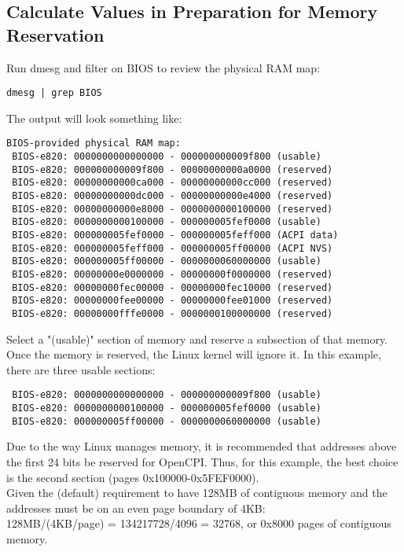 \begin{flushleft}
\subsection{Calculate Values in Preparation for Memory Reservation}
Run dmesg and filter on BIOS to review the physical RAM map: \\
\begin{lstlisting}
dmesg | grep BIOS
\end{lstlisting}
The output will look something like:
\begin{lstlisting}
BIOS-provided physical RAM map:
 BIOS-e820: 0000000000000000 - 000000000009f800 (usable)
 BIOS-e820: 000000000009f800 - 00000000000a0000 (reserved)
 BIOS-e820: 00000000000ca000 - 00000000000cc000 (reserved)
 BIOS-e820: 00000000000dc000 - 00000000000e4000 (reserved)
 BIOS-e820: 00000000000e8000 - 0000000000100000 (reserved)
 BIOS-e820: 0000000000100000 - 000000005fef0000 (usable)
 BIOS-e820: 000000005fef0000 - 000000005feff000 (ACPI data)
 BIOS-e820: 000000005feff000 - 000000005ff00000 (ACPI NVS)
 BIOS-e820: 000000005ff00000 - 0000000060000000 (usable)
 BIOS-e820: 00000000e0000000 - 00000000f0000000 (reserved)
 BIOS-e820: 00000000fec00000 - 00000000fec10000 (reserved)
 BIOS-e820: 00000000fee00000 - 00000000fee01000 (reserved)
 BIOS-e820: 00000000fffe0000 - 0000000100000000 (reserved)
\end{lstlisting}
Select a "(usable)" section of memory and reserve a subsection of that memory. Once the memory is reserved, the Linux kernel will ignore it.  In
this example, there are three usable sections:\\
\begin{lstlisting}
 BIOS-e820: 0000000000000000 - 000000000009f800 (usable)
 BIOS-e820: 0000000000100000 - 000000005fef0000 (usable)
 BIOS-e820: 000000005ff00000 - 0000000060000000 (usable)
\end{lstlisting}
Due to the way Linux manages memory, it is recommended that addresses above the first 24 bits be reserved for OpenCPI. Thus, for this example, the best choice is the second section (pages 0x100000-0x5FEF0000).  \\ \medskip
Given the (default) requirement to have 128MB of contiguous memory and the addresses must be on an even page boundary of 4KB:\\ \medskip 128MB/(4KB/page) = 134217728/4096 = 32768, or 0x8000 pages of contiguous memory. \\ \medskip


\end{flushleft}
